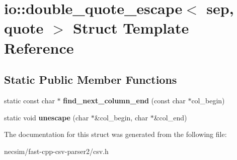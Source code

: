 \hypertarget{structio_1_1double__quote__escape}{}\section{io\+:\+:double\+\_\+quote\+\_\+escape$<$ sep, quote $>$ Struct Template Reference}
\label{structio_1_1double__quote__escape}
\subsection*{Static Public Member Functions}
\begin{DoxyCompactItemize}
\item 
static const char $\ast$ {\bfseries find\+\_\+next\+\_\+column\+\_\+end} (const char $\ast$col\+\_\+begin)\hypertarget{structio_1_1double__quote__escape_a30070914039ca8a20f716fbf53d68c41}{}\label{structio_1_1double__quote__escape_a30070914039ca8a20f716fbf53d68c41}

\item 
static void {\bfseries unescape} (char $\ast$\&col\+\_\+begin, char $\ast$\&col\+\_\+end)\hypertarget{structio_1_1double__quote__escape_a02e332751916fbdb7b35c238d690e580}{}\label{structio_1_1double__quote__escape_a02e332751916fbdb7b35c238d690e580}

\end{DoxyCompactItemize}


The documentation for this struct was generated from the following file\+:\begin{DoxyCompactItemize}
\item 
necsim/fast-\/cpp-\/csv-\/parser2/csv.\+h\end{DoxyCompactItemize}

